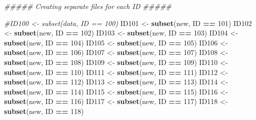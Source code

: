 \documentclass[
]{book}
\newenvironment{Shaded}{\begin{snugshade}}{\end{snugshade}}
\newcommand{\CommentTok}[1]{\textcolor[rgb]{0.56,0.35,0.01}{\textit{#1}}}
\newcommand{\DecValTok}[1]{\textcolor[rgb]{0.00,0.00,0.81}{#1}}
\newcommand{\KeywordTok}[1]{\textcolor[rgb]{0.13,0.29,0.53}{\textbf{#1}}}
\newcommand{\NormalTok}[1]{#1}
\newcommand{\OperatorTok}[1]{\textcolor[rgb]{0.81,0.36,0.00}{\textbf{#1}}}
\newcommand{\StringTok}[1]{\textcolor[rgb]{0.31,0.60,0.02}{#1}}
\begin{document}
\begin{Shaded}
\begin{Highlighting}[]
{{{{{{\CommentTok{##### Creating separate files for each ID #####}

\CommentTok{#ID100 <- subset(data, ID == 100)}
\NormalTok{ID101 <-}\StringTok{ }\KeywordTok{subset}\NormalTok{(new, ID }\OperatorTok{==}\StringTok{ }\DecValTok{101}\NormalTok{)}
\NormalTok{ID102 <-}\StringTok{ }\KeywordTok{subset}\NormalTok{(new, ID }\OperatorTok{==}\StringTok{ }\DecValTok{102}\NormalTok{)}
\NormalTok{ID103 <-}\StringTok{ }\KeywordTok{subset}\NormalTok{(new, ID }\OperatorTok{==}\StringTok{ }\DecValTok{103}\NormalTok{)}
\NormalTok{ID104 <-}\StringTok{ }\KeywordTok{subset}\NormalTok{(new, ID }\OperatorTok{==}\StringTok{ }\DecValTok{104}\NormalTok{)}
\NormalTok{ID105 <-}\StringTok{ }\KeywordTok{subset}\NormalTok{(new, ID }\OperatorTok{==}\StringTok{ }\DecValTok{105}\NormalTok{)}
\NormalTok{ID106 <-}\StringTok{ }\KeywordTok{subset}\NormalTok{(new, ID }\OperatorTok{==}\StringTok{ }\DecValTok{106}\NormalTok{)}
\NormalTok{ID107 <-}\StringTok{ }\KeywordTok{subset}\NormalTok{(new, ID }\OperatorTok{==}\StringTok{ }\DecValTok{107}\NormalTok{)}
\NormalTok{ID108 <-}\StringTok{ }\KeywordTok{subset}\NormalTok{(new, ID }\OperatorTok{==}\StringTok{ }\DecValTok{108}\NormalTok{)}
\NormalTok{ID109 <-}\StringTok{ }\KeywordTok{subset}\NormalTok{(new, ID }\OperatorTok{==}\StringTok{ }\DecValTok{109}\NormalTok{)}
\NormalTok{ID110 <-}\StringTok{ }\KeywordTok{subset}\NormalTok{(new, ID }\OperatorTok{==}\StringTok{ }\DecValTok{110}\NormalTok{)}
\NormalTok{ID111 <-}\StringTok{ }\KeywordTok{subset}\NormalTok{(new, ID }\OperatorTok{==}\StringTok{ }\DecValTok{111}\NormalTok{)}
\NormalTok{ID112 <-}\StringTok{ }\KeywordTok{subset}\NormalTok{(new, ID }\OperatorTok{==}\StringTok{ }\DecValTok{112}\NormalTok{)}
\NormalTok{ID113 <-}\StringTok{ }\KeywordTok{subset}\NormalTok{(new, ID }\OperatorTok{==}\StringTok{ }\DecValTok{113}\NormalTok{)}
\NormalTok{ID114 <-}\StringTok{ }\KeywordTok{subset}\NormalTok{(new, ID }\OperatorTok{==}\StringTok{ }\DecValTok{114}\NormalTok{)}
\NormalTok{ID115 <-}\StringTok{ }\KeywordTok{subset}\NormalTok{(new, ID }\OperatorTok{==}\StringTok{ }\DecValTok{115}\NormalTok{)}
\NormalTok{ID116 <-}\StringTok{ }\KeywordTok{subset}\NormalTok{(new, ID }\OperatorTok{==}\StringTok{ }\DecValTok{116}\NormalTok{)}
\NormalTok{ID117 <-}\StringTok{ }\KeywordTok{subset}\NormalTok{(new, ID }\OperatorTok{==}\StringTok{ }\DecValTok{117}\NormalTok{)}
\NormalTok{ID118 <-}\StringTok{ }\KeywordTok{subset}\NormalTok{(new, ID }\OperatorTok{==}\StringTok{ }\DecValTok{118}\NormalTok{)}

}}}}}}
\end{Highlighting}
\end{Shaded}
\end{document}
